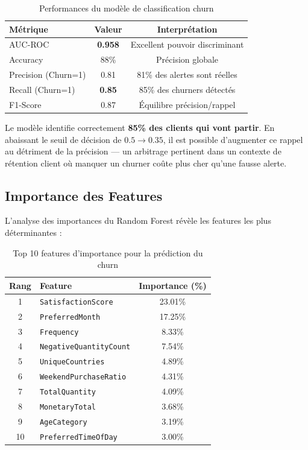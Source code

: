 \documentclass[12pt,a4paper]{article}
\begin{document}
\begin{table}[H]
\centering
\caption{Performances du modèle de classification churn}
\begin{tabular}{lcc}
\toprule
\textbf{Métrique} & \textbf{Valeur} & \textbf{Interprétation} \\
\midrule
AUC-ROC      & \textbf{0.958} & Excellent pouvoir discriminant \\
Accuracy     & 88\%           & Précision globale \\
Precision (Churn=1) & 0.81  & 81\% des alertes sont réelles \\
Recall (Churn=1)    & \textbf{0.85} & 85\% des churners détectés \\
F1-Score     & 0.87           & Équilibre précision/rappel \\
\bottomrule
\end{tabular}
\end{table}

\begin{resultbox}
Le modèle identifie correctement \textbf{85\% des clients qui vont partir}.
En abaissant le seuil de décision de $0.5 \to 0.35$, il est possible d'augmenter ce rappel
au détriment de la précision — un arbitrage pertinent dans un contexte de rétention client
où manquer un churner coûte plus cher qu'une fausse alerte.
\end{resultbox}

\subsection{Importance des Features}

L'analyse des importances du Random Forest révèle les features les plus déterminantes :

\begin{table}[H]
\centering
\caption{Top 10 features d'importance pour la prédiction du churn}
\begin{tabular}{clc}
\toprule
\textbf{Rang} & \textbf{Feature} & \textbf{Importance (\%)} \\
\midrule
1 & \texttt{SatisfactionScore}          & 23.01\% \\
2 & \texttt{PreferredMonth}             & 17.25\% \\
3 & \texttt{Frequency}                  & 8.33\% \\
4 & \texttt{NegativeQuantityCount}      & 7.54\% \\
5 & \texttt{UniqueCountries}            & 4.89\% \\
6 & \texttt{WeekendPurchaseRatio}       & 4.31\% \\
7 & \texttt{TotalQuantity}              & 4.09\% \\
8 & \texttt{MonetaryTotal}              & 3.68\% \\
9 & \texttt{AgeCategory}               & 3.19\% \\
10 & \texttt{PreferredTimeOfDay}        & 3.00\% \\
\bottomrule
\end{tabular}
\end{table}
\end{document}

